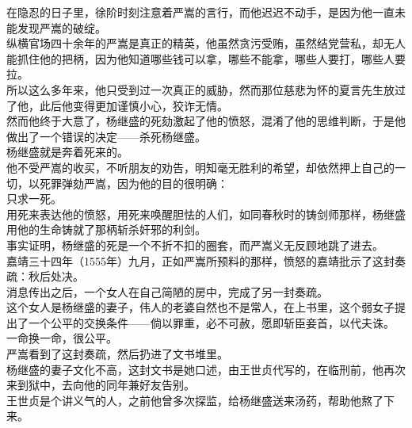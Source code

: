 \begin{multicols}{\theparacolNo}
在隐忍的日子里，徐阶时刻注意着严嵩的言行，而他迟迟不动手，是因为他一直未能发现严嵩的破绽。\\

纵横官场四十余年的严嵩是真正的精英，他虽然贪污受贿，虽然结党营私，却无人能抓住他的把柄，因为他知道哪些钱可以拿，哪些不能拿，哪些人要打，哪些人要拉。\\

所以这么多年来，他只受到过一次真正的威胁，然而那位慈悲为怀的夏言先生放过了他，此后他变得更加谨慎小心，狡诈无情。\\

然而他终于大意了，杨继盛的死劾激起了他的愤怒，混淆了他的思维判断，于是他做出了一个错误的决定——杀死杨继盛。\\

杨继盛就是奔着死来的。\\

他不受严嵩的收买，不听朋友的劝告，明知毫无胜利的希望，却依然押上自己的一切，以死罪弹劾严嵩，因为他的目的很明确：\\

只求一死。\\

用死来表达他的愤怒，用死来唤醒胆怯的人们，如同春秋时的铸剑师那样，杨继盛用他的生命铸就了那柄斩杀奸邪的利剑。\\

事实证明，杨继盛的死是一个不折不扣的圈套，而严嵩义无反顾地跳了进去。\\

嘉靖三十四年（1555年）九月，正如严嵩所预料的那样，愤怒的嘉靖批示了这封奏疏：秋后处决。\\

消息传出之后，一个女人在自己简陋的房中，完成了另一封奏疏。\\

这个女人是杨继盛的妻子，伟人的老婆自然也不是常人，在上书里，这个弱女子提出了一个公平的交换条件——倘以罪重，必不可赦，愿即斩臣妾首，以代夫诛。\\

一命换一命，很公平。\\

严嵩看到了这封奏疏，然后扔进了文书堆里。\\

杨继盛的妻子文化不高，这封文书是她口述，由王世贞代写的，在临刑前，他再次来到狱中，去向他的同年兼好友告别。\\

王世贞是个讲义气的人，之前他曾多次探监，给杨继盛送来汤药，帮助他熬了下来。\\


\end{multicols}
